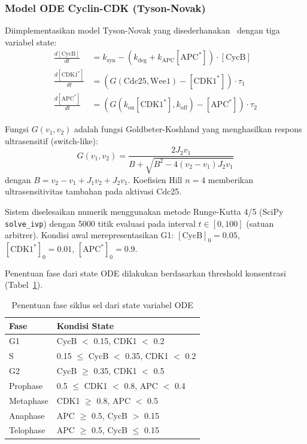 \documentclass[conference]{IEEEtran}
\begin{document}
\subsubsection{Model ODE Cyclin-CDK (Tyson-Novak)}
Diimplementasikan model Tyson-Novak yang disederhanakan~\cite{tyson2001} dengan tiga variabel state:
\begin{align}
    \frac{d[\text{CycB}]}{dt} &= k_{\text{syn}} - (k_{\text{deg}} + k_{\text{APC}}[\text{APC}^*]) \cdot [\text{CycB}] \label{eq:cycb}\\
    \frac{d[\text{CDK1}^*]}{dt} &= \left(G(\text{Cdc25}, \text{Wee1}) - [\text{CDK1}^*]\right) \cdot \tau_1 \label{eq:cdk}\\
    \frac{d[\text{APC}^*]}{dt} &= \left(G(k_{\text{on}}[\text{CDK1}^*], k_{\text{off}}) - [\text{APC}^*]\right) \cdot \tau_2 \label{eq:apc}
\end{align}

Fungsi $G(v_1, v_2)$ adalah fungsi Goldbeter-Koshland yang menghasilkan respons ultrasensitif (switch-like):
\begin{equation}
    G(v_1, v_2) = \frac{2 J_2 v_1}{B + \sqrt{B^2 - 4(v_2-v_1)J_2 v_1}}
\end{equation}
dengan $B = v_2 - v_1 + J_1 v_2 + J_2 v_1$. Koefisien Hill $n=4$ memberikan ultrasensitivitas tambahan pada aktivasi Cdc25.

Sistem diselesaikan numerik menggunakan metode Runge-Kutta 4/5 (SciPy \texttt{solve\_ivp}) dengan 5000 titik evaluasi pada interval $t \in [0, 100]$ (satuan arbitrer). Kondisi awal merepresentasikan G1: $[\text{CycB}]_0 = 0.05$, $[\text{CDK1}^*]_0 = 0.01$, $[\text{APC}^*]_0 = 0.9$.

Penentuan fase dari state ODE dilakukan berdasarkan threshold konsentrasi (Tabel~\ref{tab:phase_assign}).

\begin{table}[!t]
\centering
\caption{Penentuan fase siklus sel dari state variabel ODE}
\label{tab:phase_assign}
\footnotesize
\begin{tabular}{@{}lp{5.5cm}@{}}
\toprule
\textbf{Fase} & \textbf{Kondisi State} \\
\midrule
G1 & CycB $<$ 0.15, CDK1 $<$ 0.2 \\
S & 0.15 $\leq$ CycB $<$ 0.35, CDK1 $<$ 0.2 \\
G2 & CycB $\geq$ 0.35, CDK1 $<$ 0.5 \\
Prophase & 0.5 $\leq$ CDK1 $<$ 0.8, APC $<$ 0.4 \\
Metaphase & CDK1 $\geq$ 0.8, APC $<$ 0.5 \\
Anaphase & APC $\geq$ 0.5, CycB $>$ 0.15 \\
Telophase & APC $\geq$ 0.5, CycB $\leq$ 0.15 \\
\bottomrule
\end{tabular}
\end{table}
\end{document}

